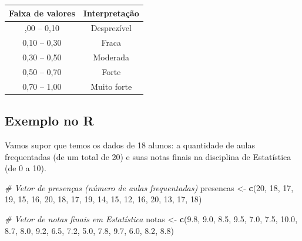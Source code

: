 \documentclass[
]{book}
\newenvironment{Shaded}{\begin{snugshade}}{\end{snugshade}}
\newcommand{\CommentTok}[1]{\textcolor[rgb]{0.56,0.35,0.01}{\textit{#1}}}
\newcommand{\DecValTok}[1]{\textcolor[rgb]{0.00,0.00,0.81}{#1}}
\newcommand{\FloatTok}[1]{\textcolor[rgb]{0.00,0.00,0.81}{#1}}
\newcommand{\FunctionTok}[1]{\textcolor[rgb]{0.13,0.29,0.53}{\textbf{#1}}}
\newcommand{\NormalTok}[1]{#1}
\newcommand{\OtherTok}[1]{\textcolor[rgb]{0.56,0.35,0.01}{#1}}
\newcounter{none} %
\begin{document}
{\def\LTcaptype{none} %
\begin{longtable}[]{@{}cc@{}}
\toprule\noalign{}
Faixa de valores & Interpretação \\
\midrule\noalign{}
\endhead
\bottomrule\noalign{}
\endlastfoot
0,00 -- 0,10 & Desprezível \\
0,10 -- 0,30 & Fraca \\
0,30 -- 0,50 & Moderada \\
0,50 -- 0,70 & Forte \\
0,70 -- 1,00 & Muito forte \\
\end{longtable}
}

\subsection{Exemplo no R}\label{exemplo-no-r}

Vamos supor que temos os dados de 18 alunos: a quantidade de aulas frequentadas (de um total de 20) e suas notas finais na disciplina de Estatística (de 0 a 10).

\begin{Shaded}
\begin{Highlighting}[]
\CommentTok{\# Vetor de presenças (número de aulas frequentadas)}
\NormalTok{presencas }\OtherTok{\textless{}{-}} \FunctionTok{c}\NormalTok{(}\DecValTok{20}\NormalTok{, }\DecValTok{18}\NormalTok{, }\DecValTok{17}\NormalTok{, }\DecValTok{19}\NormalTok{, }\DecValTok{15}\NormalTok{, }\DecValTok{16}\NormalTok{, }\DecValTok{20}\NormalTok{, }\DecValTok{18}\NormalTok{, }\DecValTok{17}\NormalTok{, }\DecValTok{19}\NormalTok{, }\DecValTok{14}\NormalTok{, }\DecValTok{15}\NormalTok{, }\DecValTok{12}\NormalTok{, }\DecValTok{16}\NormalTok{, }\DecValTok{20}\NormalTok{, }\DecValTok{13}\NormalTok{, }\DecValTok{17}\NormalTok{, }\DecValTok{18}\NormalTok{)}

\CommentTok{\# Vetor de notas finais em Estatística}
\NormalTok{notas }\OtherTok{\textless{}{-}} \FunctionTok{c}\NormalTok{(}\FloatTok{9.8}\NormalTok{, }\FloatTok{9.0}\NormalTok{, }\FloatTok{8.5}\NormalTok{, }\FloatTok{9.5}\NormalTok{, }\FloatTok{7.0}\NormalTok{, }\FloatTok{7.5}\NormalTok{, }\FloatTok{10.0}\NormalTok{, }\FloatTok{8.7}\NormalTok{, }\FloatTok{8.0}\NormalTok{, }\FloatTok{9.2}\NormalTok{, }\FloatTok{6.5}\NormalTok{, }\FloatTok{7.2}\NormalTok{, }\FloatTok{5.0}\NormalTok{, }\FloatTok{7.8}\NormalTok{, }\FloatTok{9.7}\NormalTok{, }\FloatTok{6.0}\NormalTok{, }\FloatTok{8.2}\NormalTok{, }\FloatTok{8.8}\NormalTok{)}
\end{Highlighting}
\end{Shaded}
\end{document}
